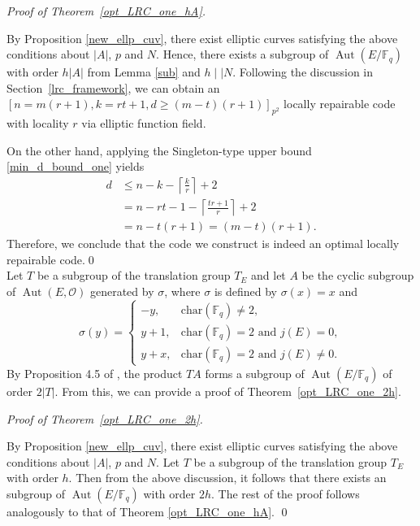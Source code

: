 \documentclass[journal,12pt,onecolumn]{IEEEtran}
\begin{document}
{
\raggedright
{\it Proof of Theorem~\ref{opt_LRC_one_hA}.} 
}By Proposition \ref{new_ellp_cuv}, there exist elliptic curves satisfying the above conditions about \(|A|\), \( p \) and \(N\). Hence, there exists a subgroup of \( \operatorname{Aut}(E/\mathbb{F}_q) \) with order \(h|A|\) from Lemma \ref{sub} and \(h\mid\mid N\). Following the discussion in Section~\ref{lrc_framework}, we can obtain an \([n = m(r+1), k = rt+1, d \ge (m-t)(r+1)]_{p^2}\) locally repairable code with locality \( r \) via elliptic function field. 

    On the other hand, applying the Singleton-type upper bound \eqref{min_d_bound_one} yields 
    \begin{align*}
        d &\leq n - k - \left\lceil \frac{k}{r} \right\rceil + 2 \\
        & = n - rt - 1 - \left\lceil \frac{tr + 1}{r} \right\rceil + 2 \\
        &= n - t(r + 1) = (m-t)(r+1).
    \end{align*}
    Therefore, we conclude that the code we construct is indeed an optimal locally repairable code.\qed
\\

Let \(T\) be a subgroup of the translation group \(T_E\) and let \(A\) be the cyclic subgroup of \(\operatorname{Aut}(E, \mathcal{O})\) generated by \(\sigma\), where \(\sigma\) is defined by \(\sigma(x) = x\) and
\[
    \sigma(y) =
    \begin{cases} 
        -y, & \text{char}(\mathbb{F}_q) \neq 2, \\
        y + 1, & \text{char}(\mathbb{F}_q) = 2 \text{ and } j(E) = 0, \\
        y + x, & \text{char}(\mathbb{F}_q) = 2 \text{ and } j(E) \neq 0.
    \end{cases}
\]
By Proposition 4.5 of \cite{MA2023105686}, the product \(TA\) forms a subgroup of \(\operatorname{Aut}(E/\mathbb{F}_q)\) of order \(2|T|\). From this, we can provide a proof of Theorem~\ref{opt_LRC_one_2h}.
\\

{
\raggedright
{\it Proof of Theorem~\ref{opt_LRC_one_2h}.} 
}By Proposition \ref{new_ellp_cuv}, there exist elliptic curves satisfying the above conditions about \(|A|\), \( p \) and \(N\). Let \(T\) be a subgroup of the translation group \(T_E\) with order \(h\). Then from the above discussion, it follows that there exists an subgroup of \( \operatorname{Aut}(E/\mathbb{F}_q) \) with order \(2h\). The rest of the proof follows analogously to that of Theorem \ref{opt_LRC_one_hA}. \qed
\end{document}
